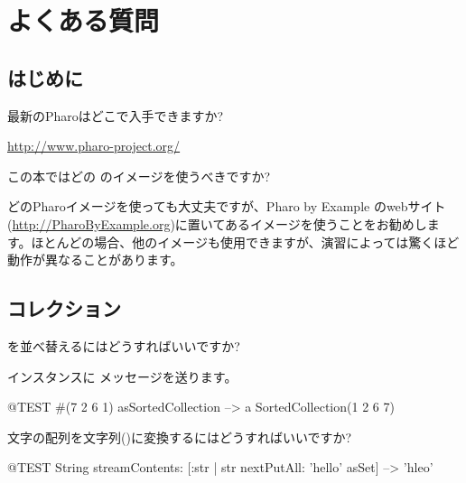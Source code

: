 \documentclass[a4paper,10pt,twoside]{book}
\begin{document}
	\renewcommand{\nnbb}[2]{} %
	\sloppy
\fi
\chapter{よくある質問}
\label{app:faq}


\section{はじめに}
\begin{faq}
最新のPharoはどこで入手できますか?
\end{faq}
\answer
\url{http://www.pharo-project.org/}

\begin{faq}
この本ではどの \pharo のイメージを使うべきですか?
\end{faq}
\answer
どのPharoイメージを使っても大丈夫ですが、Pharo by Example のwebサイト(\url{http://PharoByExample.org})に置いてあるイメージを使うことをお勧めします。ほとんどの場合、他のイメージも使用できますが、演習によっては驚くほど動作が異なることがあります。

\section{コレクション}

\begin{faq}
 を並べ替えるにはどうすればいいですか?
\end{faq}
\answer
インスタンスに  メッセージを送ります。

\begin{code}{@TEST}
#(7 2 6 1) asSortedCollection --> a SortedCollection(1 2 6 7)
\end{code}

\begin{faq}
文字の配列を文字列()に変換するにはどうすればいいですか?
\end{faq}
\answer
\begin{code}{@TEST}
String streamContents: [:str | str nextPutAll: 'hello' asSet] --> 'hleo'
\end{code}
\end{document}
